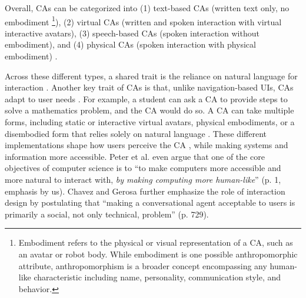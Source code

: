 \documentclass[manuscript,anonymous,sigconf]{acmart}
\begin{document}
Overall, %
CAs can be categorized into (1) text-based CAs (written text only, no embodiment \footnote{Embodiment refers to the physical or visual representation of a CA, such as an avatar or robot body. While embodiment is one possible anthropomorphic attribute, anthropomorphism is a broader concept encompassing any human-like characteristic including name, personality, communication style, and behavior.}), (2) virtual CAs (written and spoken interaction with virtual interactive avatars), (3) speech-based CAs (spoken interaction without embodiment), and (4) physical CAs (spoken interaction with physical embodiment) \citep{diederich_design_2022}. 

Across these different types, a shared trait is the reliance on natural language for interaction \citep{diederich_design_2022}. 
Another key trait of CAs is that, unlike navigation-based UIs, CAs adapt to user needs \citep{allouch2021conversational,jain2018evaluating}. For example, a student can ask a CA to provide steps to solve a mathematics problem, and the CA would do so. A CA can take multiple forms, including static or interactive virtual avatars, physical embodiments, or a disembodied form that relies solely on natural language \citep{diederich_conversational_2019,diederich_design_2022}. These different implementations shape how users perceive the CA \citep{peter_benefits_2025}, while making systems and information more accessible. Peter et al. \cite{peter_benefits_2025} even argue that one of the core objectives of computer science is to ``to make computers more accessible and more natural to interact with, \textit{by making computing more human-like}'' (p. 1, emphasis by us). Chavez and Gerosa \cite{chaves2021should} further emphasize the role of interaction design by postulating that ``making a conversational agent acceptable to users is primarily a social, not only technical, problem'' (p. 729).

\end{document}

